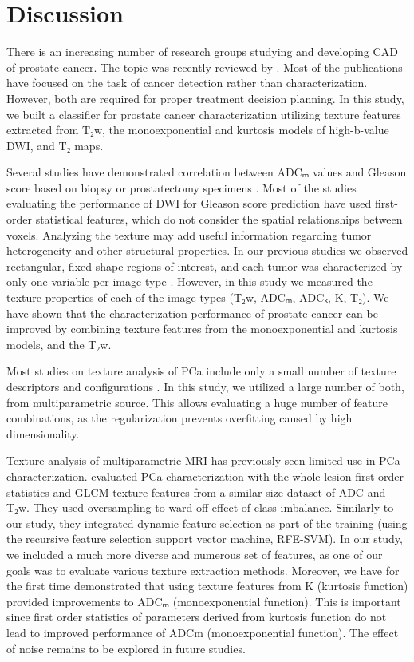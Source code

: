 \section{Discussion}

There is an increasing number of research groups studying and developing CAD of
prostate cancer. The topic was recently reviewed by \citet{Lemaitre2015}. Most
of the publications have focused on the task of cancer detection rather than
characterization. However, both are required for proper treatment decision
planning. In this study, we built a classifier for prostate cancer
characterization utilizing texture features extracted from T₂w, the
monoexponential and kurtosis models of high-b-value DWI, and T₂ maps.

Several studies have demonstrated correlation between ADCₘ values and Gleason
score based on biopsy \citep{Turkbey2011, Tamada2008} or prostatectomy specimens
\citep{Toivonen2015, Peng2013, Boesen2015, Rosenkrantz2015, Donati2014}. Most of
the studies evaluating the performance of DWI for Gleason score prediction have
used first-order statistical features, which do not consider the spatial
relationships between voxels. Analyzing the texture may add useful information
regarding tumor heterogeneity and other structural properties. In our previous
studies we observed rectangular, fixed-shape regions-of-interest, and each tumor
was characterized by only one variable per image type \citep{Toivonen2015,
Jambor2015Relaxation, Jambor2015Rotating}. However, in this study we measured
the texture properties of each of the image types (T₂w, ADCₘ, ADCₖ, K, T₂).
We have shown that the characterization performance of prostate cancer can be
improved by combining texture features from the monoexponential and kurtosis
models, and the T₂w.

Most studies on texture analysis of PCa include only a small number of texture
descriptors and configurations \citep{Kwak2015, Viswanath2012, Ginsburg2014}. In
this study, we utilized a large number of both, from multiparametric source.
This allows evaluating a huge number of feature combinations, as the
regularization prevents overfitting caused by high dimensionality.

Texture analysis of multiparametric MRI has previously seen limited use in PCa
characterization. \citet{Fehr2015} evaluated PCa characterization with the
whole-lesion first order statistics and GLCM texture features from a
similar-size dataset of ADC and T₂w. They used oversampling to ward off effect
of class imbalance. Similarly to our study, they integrated dynamic feature
selection as part of the training (using the recursive feature selection support
vector machine, RFE-SVM). In our study, we included a much more diverse and
numerous set of features, as one of our goals was to evaluate various texture
extraction methods. Moreover, we have for the first time demonstrated that using
texture features from K (kurtosis function) provided improvements to ADCₘ
(monoexponential function). This is important since first order statistics of
parameters derived from kurtosis function do not lead to improved performance of
ADCm (monoexponential function). The effect of noise remains to be explored in
future studies.


